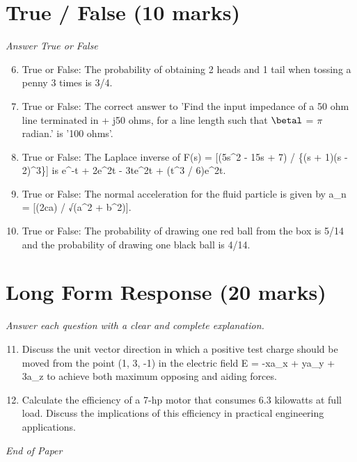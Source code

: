 \documentclass[12pt]{article}
\begin{document}
\section*{True / False (10 marks)}
\textit{Answer True or False}
\begin{enumerate}[label=\arabic*.]
\setcounter{enumi}{5}
\item True or False: The probability of obtaining 2 heads and 1 tail when tossing a penny 3 times is 3/4.
\item True or False: The correct answer to 'Find the input impedance of a 50 ohm line terminated in + j50 ohms, for a line length such that \ensuremath{\betal} = \ensuremath{\pi} radian.' is '100 ohms'.
\item True or False: The Laplace inverse of F(s) = [(5s\^{}2 - 15s + 7) / \{(s + 1)(s - 2)\^{}3\}] is e\^{}-t + 2e\^{}2t - 3te\^{}2t + (t\^{}3 / 6)e\^{}2t.
\item True or False: The normal acceleration for the fluid particle is given by a\_n = [(2ca) / √(a\^{}2 + b\^{}2)].
\item True or False: The probability of drawing one red ball from the box is 5/14 and the probability of drawing one black ball is 4/14.
\end{enumerate}

\section*{Long Form Response (20 marks)}
\textit{Answer each question with a clear and complete explanation.}
\begin{enumerate}[label=\arabic*.]
\setcounter{enumi}{10}
\item Discuss the unit vector direction in which a positive test charge should be moved from the
point (1, 3, -1) in the electric field E = -xa\_x + ya\_y + 3a\_z to achieve both maximum
opposing and aiding forces.
\item Calculate the efficiency of a 7-hp motor that consumes 6.3 kilowatts at full load. Discuss
the implications of this efficiency in practical engineering applications.
\end{enumerate}

\vfill
\noindent\textit{End of Paper}
\end{document}
